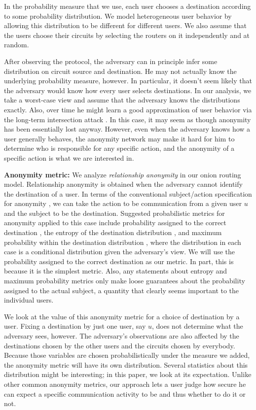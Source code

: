 \documentclass[prodmode,acmtissec]{acmsmall}
\begin{document}
In the probability measure that we use, each user chooses a destination according to some probability distribution.  We model heterogeneous user behavior by  allowing this distribution to be different for different users.  We also assume that the users choose their circuits by selecting the routers on it independently and at random.


After observing the protocol, the adversary
can in principle infer some distribution on circuit source and
destination.  He may not actually know the underlying probability
measure, however.  In particular, it doesn't seem likely that the
adversary would know how every user selects destinations.  In our
analysis, we take a worst-case view and assume that the adversary
knows the distributions exactly.  Also, over time he might learn a
good approximation of user behavior via the long-term intersection
attack \cite{DanSer04}.  In this case, it may seem as though anonymity
has been essentially lost anyway.  However, even when the adversary
knows how a user generally behaves, the anonymity network may make it
hard for him to determine who is responsible for any specific action,
and the anonymity of a specific action is what we are interested in.

{\bf Anonymity metric:} We analyze \emph{relationship anonymity} \cite{terminology,ShWa-Relationship} in our onion routing model.  Relationship anonymity is obtained when the adversary cannot identify the destination of a user.  In terms of the conventional subject/action specification for anonymity \cite{terminology}, we can take the action to be communication from a given user $u$ and the subject to be the destination.  Suggested probabilistic metrics for anonymity applied to this case include probability assigned to the correct destination \cite{crowds:tissec}, the entropy of the destination distribution \cite{Diaz02,Serj02}, and maximum probability within the destination distribution \cite{TOTH}, where the distribution in each case is a conditional distribution given the adversary's view.  We will use the probability assigned to the correct destination as our metric.  In part, this is because it is the simplest metric.  Also, any statements about entropy and maximum probability metrics only make loose guarantees about the probability assigned to the actual subject, a quantity that clearly seems important to the individual users.

We look at the value of this anonymity metric for a choice of
destination by a user.  Fixing a destination by just one user, say
$u$, does not determine what the adversary sees, however.  The
adversary's observations are also affected by the destinations chosen
by the other users and the circuits chosen by everybody.  Because
those variables are chosen probabilistically under the measure we
added, the anonymity metric will have its own distribution.  Several
statistics about this distribution might be interesting; in this
paper, we look at its expectation. Unlike other common anonymity
metrics, our approach lets a user judge how secure he can expect a
specific communication activity to be and thus whether to do it or
not.
\end{document}
